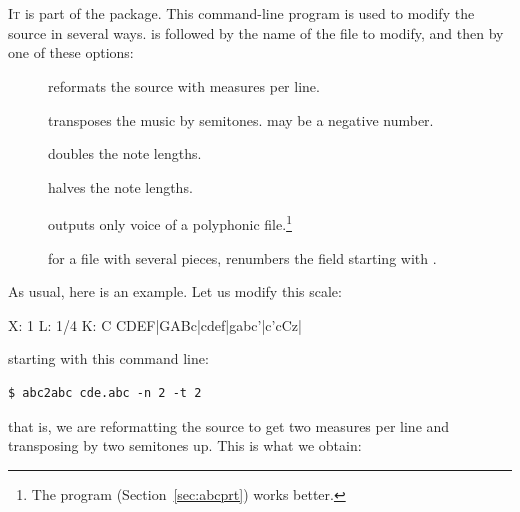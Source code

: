 \documentclass[a4paper,fullpage,12pt]{book}
\begin{document}



\section{}

\lettrine{I}{t} is part of the \abcMID{} package. This command-line
program is used to modify the \ABC{} source in several ways.
 is followed by the name of the file to modify, and then
by one of these options:

\begin{description}
  
  \item [ ] reformats the source with  measures
  per line.
  
  \item [ ] transposes the music by  semitones.
   may be a negative number.
  
  \item [] doubles the note lengths.
  
  \item [] halves the note lengths.
  
  \item [ ] outputs only voice  of a
  polyphonic file.\footnote{The program 
  (Section~\ref{sec:abcprt}) works better.}
  
  \item [ ] for a file with several pieces, renumbers the
   field starting with .
  
\end{description}

As usual, here is an example. Let us modify this scale:

\begin{abcsource}
X: 1
L: 1/4
K: C
CDEF|GABc|cdef|gabc'|c'cCz|
\end{abcsource}

starting  with this command line:

\begin{verbatim}
$ abc2abc cde.abc -n 2 -t 2
\end{verbatim}

that is, we are reformatting the source to get two measures per line
and transposing by two semitones up. This is what we obtain:
\end{document}

